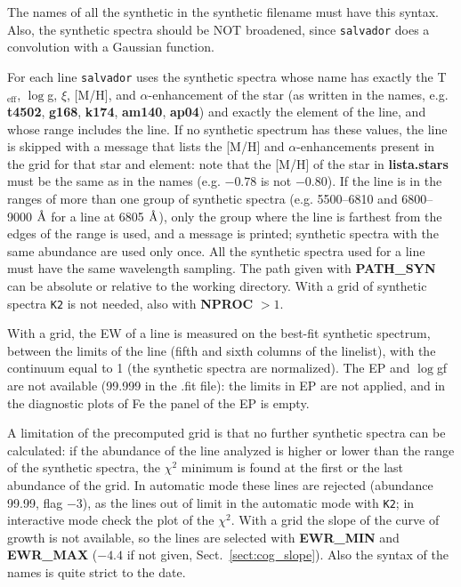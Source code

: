\documentclass[modern]{aastex701}
\newcommand{\angstrom}{\mbox{\normalfont\AA}}
\begin{document}
The names of all the synthetic in the synthetic filename must have this syntax. Also, the synthetic spectra should be NOT broadened, since \texttt{salvador} does a convolution with a Gaussian function. 

For each line \texttt{salvador} uses the synthetic spectra whose name has exactly the T$_{\mathrm{eff}}$, $\log$g, $\xi$, [M/H], and $\alpha$-enhancement of the star (as written in the names, e.g. {\bf t4502}, {\bf g168}, {\bf k174}, {\bf am140}, {\bf ap04}) and exactly the element of the line, and whose range includes the line. If no synthetic spectrum has these values, the line is skipped with a message that lists the [M/H] and $\alpha$-enhancements present in the grid for that star and element: note that the [M/H] of the star in {\bf lista.stars} must be the same as in the names (e.g. $-0.78$ is not $-0.80$). If the line is in the ranges of more than one group of synthetic spectra (e.g. 5500--6810 and 6800--9000 $\angstrom$ for a line at 6805 $\angstrom$), only the group where the line is farthest from the edges of the range is used, and a message is printed; synthetic spectra with the same abundance are used only once. All the synthetic spectra used for a line must have the same wavelength sampling. The path given with {\bf PATH\_SYN} can be absolute or relative to the working directory. With a grid of synthetic spectra \texttt{K2} is not needed, also with {\bf NPROC} $> 1$.

With a grid, the EW of a line is measured on the best-fit synthetic spectrum, between the limits of the line (fifth and sixth columns of the linelist), with the continuum equal to 1 (the synthetic spectra are normalized). The EP and $\log$gf are not available (99.999 in the .fit file): the limits in EP are not applied, and in the diagnostic plots of Fe the panel of the EP is empty.

A limitation of the precomputed grid is that no further synthetic spectra can be calculated: if the abundance of the line analyzed is higher or lower than the range of the synthetic spectra, the $\chi^2$ minimum is found at the first or the last abundance of the grid. In automatic mode these lines are rejected (abundance 99.99, flag $-3$), as the lines out of limit in the automatic mode with \texttt{K2}; in interactive mode check the plot of the $\chi^2$. With a grid the slope of the curve of growth is not available, so the lines are selected with {\bf EWR\_MIN} and {\bf EWR\_MAX} ($-4.4$ if not given, Sect.~\ref{sect:cog_slope}). Also the syntax of the names is quite strict to the date.
\end{document}
